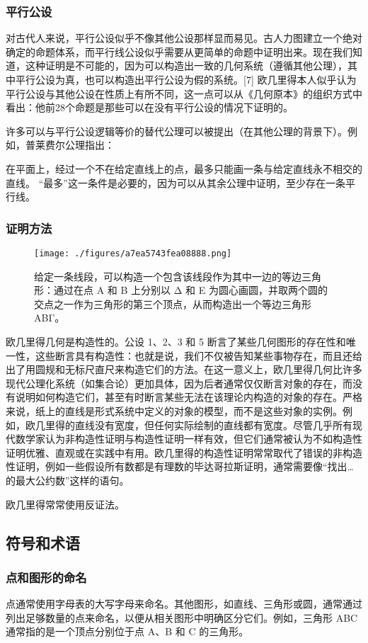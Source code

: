 \subsubsection{平行公设}  
对古代人来说，平行公设似乎不像其他公设那样显而易见。古人力图建立一个绝对确定的命题体系，而平行线公设似乎需要从更简单的命题中证明出来。现在我们知道，这种证明是不可能的，因为可以构造出一致的几何系统（遵循其他公理），其中平行公设为真，也可以构造出平行公设为假的系统。[7] 欧几里得本人似乎认为平行公设与其他公设在性质上有所不同，这一点可以从《几何原本》的组织方式中看出：他前28个命题是那些可以在没有平行公设的情况下证明的。

许多可以与平行公设逻辑等价的替代公理可以被提出（在其他公理的背景下）。例如，普莱费尔公理指出：

在平面上，经过一个不在给定直线上的点，最多只能画一条与给定直线永不相交的直线。  
“最多”这一条件是必要的，因为可以从其余公理中证明，至少存在一条平行线。
\subsubsection{证明方法} 
\begin{figure}[ht]
\centering
\texttt{[image: ./figures/a7ea5743fea08888.png]}
\caption{给定一条线段，可以构造一个包含该线段作为其中一边的等边三角形：通过在点 Α 和 Β 上分别以 Δ 和 Ε 为圆心画圆，并取两个圆的交点之一作为三角形的第三个顶点，从而构造出一个等边三角形 ΑΒΓ。} \label{fig_OJLJH_3}
\end{figure}
欧几里得几何是构造性的。公设 1、2、3 和 5 断言了某些几何图形的存在性和唯一性，这些断言具有构造性：也就是说，我们不仅被告知某些事物存在，而且还给出了用圆规和无标尺直尺来构造它们的方法。在这一意义上，欧几里得几何比许多现代公理化系统（如集合论）更加具体，因为后者通常仅仅断言对象的存在，而没有说明如何构造它们，甚至有时断言某些无法在该理论内构造的对象的存在。严格来说，纸上的直线是形式系统中定义的对象的模型，而不是这些对象的实例。例如，欧几里得的直线没有宽度，但任何实际绘制的直线都有宽度。尽管几乎所有现代数学家认为非构造性证明与构造性证明一样有效，但它们通常被认为不如构造性证明优雅、直观或在实践中有用。欧几里得的构造性证明常常取代了错误的非构造性证明，例如一些假设所有数都是有理数的毕达哥拉斯证明，通常需要像“找出…的最大公约数”这样的语句。

欧几里得常常使用反证法。
\subsection{符号和术语}  
\subsubsection{点和图形的命名}  
点通常使用字母表的大写字母来命名。其他图形，如直线、三角形或圆，通常通过列出足够数量的点来命名，以便从相关图形中明确区分它们。例如，三角形 ABC 通常指的是一个顶点分别位于点 A、B 和 C 的三角形。
